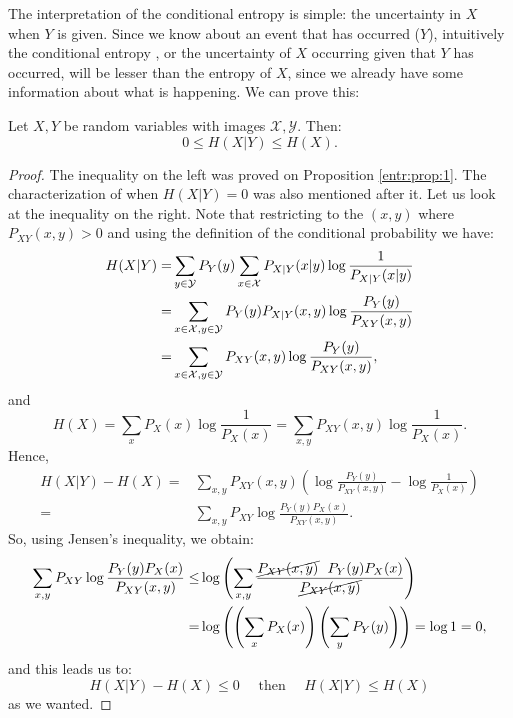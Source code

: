 The interpretation of the conditional entropy is simple: the uncertainty in $X$ when $Y$ is given.
Since we know about an event that has occurred ($Y$), intuitively the conditional entropy , or the uncertainty of $X$ occurring given that $Y$ has occurred, will be lesser than the entropy of $X$, since we already have some information about what is happening. We can prove this:

\begin{nprop}\label{entr:prop:2}
Let $X,Y$ be random variables with images $\mathcal X, \mathcal Y$. Then:
$$
0 \leq H(X|Y) \leq H(X).
$$
\end{nprop}
\begin{proof}

The inequality on the left was proved on Proposition \ref{entr:prop:1}. The characterization of when $H(X|Y) = 0$ was also mentioned after it.
Let us look at the inequality on the right. Note that restricting to the $(x,y)$ where $P_{XY}(x,y) > 0$ and using the definition of the conditional probability we have:
\begin{align*}
H(X|Y) = & \sum_{y \in \mathcal{Y}} P_Y(y) \sum_{x \in \mathcal{X}} P_{X|Y}(x|y)\log \frac{1}{P_{X|Y}(x|y)}\\
 = & \sum_{x \in \mathcal X,y \in \mathcal Y} P_Y(y) P_{X|Y}(x,y) \log \frac{P_Y(y)}{P_{XY}(x,y)} \\
  = & \sum_{x \in \mathcal X,y \in \mathcal Y} P_{XY}(x,y)\log \frac{P_Y(y)}{P_{XY}(x,y)} ,
\end{align*}
and 
$$
H(X) = \sum_x P_X(x) \log \frac{1}{P_X(x)} = \sum_{x,y}P_{XY}(x,y) \log \frac{1}{P_X(x)}.
$$
Hence,
\begin{equation}\label{eq:dif-expr-mi}
\begin{split}
H(X|Y) - H(X) = & \sum_{x,y}P_{XY}(x,y) \left( \log \frac{P_Y(y)}{P_{XY}(x,y)} - \log \frac{1}{P_X(x)}\right) \\ 
= &  \sum_{x,y}P_{XY}\log \frac{P_Y(y)P_X(x)}{P_{XY}(x,y)}.
\end{split}
\end{equation}
So, using Jensen's inequality, we obtain:
\begin{align*}
\sum_{x,y}P_{XY}\log \frac{P_Y(y)P_X(x)}{P_{XY}(x,y)} \leq & \log \left( \sum_{x,y}\frac{ \cancel{P_{XY}(x,y)} \ \  P_Y(y) P_X(x)}{\cancel{P_{XY}(x,y)}} \right) \\ 
= & \log\left( \left( \sum_x P_X(x) \right) \left(\sum_y P_Y(y)\right)\right) = \log 1 = 0,
\end{align*}
and this leads us to:
\begin{equation}\label{prop:2:2nd:ineq}
H(X|Y) - H(X) \leq 0 \quad \text{ then } \quad H(X|Y) \leq H(X)
\end{equation}
as we wanted.
\end{proof}

